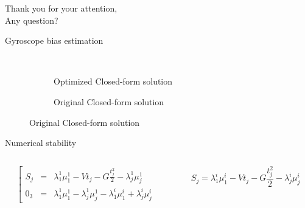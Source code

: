 \documentclass{beamer}
\begin{document}
\begin{frame}[plain,c]
  \begin{center}
    Thank you for your attention,\\
    Any question?
  \end{center}
\end{frame}

\begin{frame}[noframenumbering]{Gyroscope bias estimation}
  \begin{figure}[h!]
    \centering

    \begin{subfigure}[b]{0.78\textwidth}
      \caption{Optimized Closed-form solution}
      \resizebox{0.45\textwidth}{!}{} ~
      \resizebox{0.45\textwidth}{!}{}
    \end{subfigure}

    \begin{subfigure}[b]{0.40\textwidth}
      \caption{Original Closed-form solution}
      \resizebox{\textwidth}{!}{}
    \end{subfigure}

  \end{figure}
\end{frame}

\begin{frame}[noframenumbering]{Numerical stability}

  \begin{columns}
    \begin{column}{.5\textwidth}
    {\small
    \[
    \left[
      \begin{array}{lcl}
        S_j &=& \lambda_1^1\mu_1^1 - V t_j - G \frac{t_j^2}{2} - \lambda^1_j \mu^1_j\\
        0_3 &=& \lambda_1^1\mu_1^1 - \lambda_j^1\mu_j^1 - \lambda_1^i\mu_1^i + \lambda^i_j \mu^i_j
      \end{array}
      \right.
      \]
    }
    \end{column}
    \vrule{}
    \begin{column}{.5\textwidth}
    {\small
    \[
    S_j = \lambda_1^i\mu_1^i - V t_j - G \frac{t_j^2}{2} - \lambda^i_j \mu^i_j
    \]
    }
    \end{column}
  \end{columns}

  \begin{figure}[h!]
    \centering
    \resizebox{0.5\textwidth}{!}{}
  \end{figure}

\end{frame}



\end{document}
